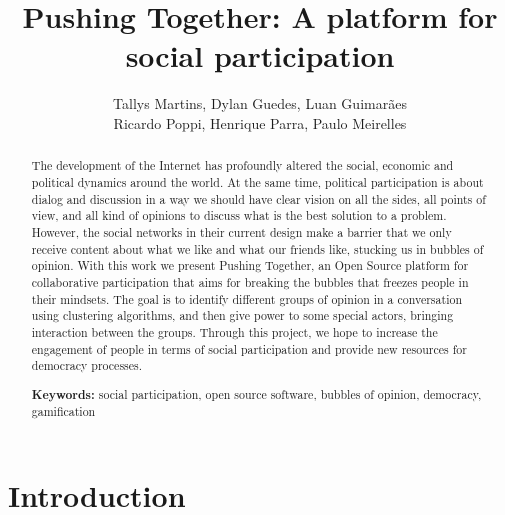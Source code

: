 \documentclass{llncs}
\begin{document}
\sloppy
\title{Pushing Together: A platform for social participation}

\author{Tallys Martins, Dylan Guedes, Luan Guimarães\\
        Ricardo Poppi, Henrique Parra, Paulo Meirelles}



\maketitle
\begin{abstract}

The development of the Internet has profoundly altered the social, economic
and political dynamics around the world. At the same time, political
participation is about dialog and discussion in a way we should have clear
vision on all the sides, all points of view, and all kind of opinions to
discuss what is the best solution to a problem. However, the social networks
in their current design make a barrier that we only receive content about what
we like and what our friends like, stucking us in bubbles of opinion.  With this work we present Pushing
Together, an Open Source platform for collaborative participation that aims for
breaking the bubbles that freezes people in their mindsets. The goal is to
identify different groups of opinion in a conversation using clustering
algorithms, and then give power to some special actors, bringing interaction
between the groups. Through this project, we hope to increase the engagement of
people in terms of social participation and provide new resources for democracy
processes.

\textbf{Keywords:} social participation, open source software, bubbles of
opinion, democracy, gamification
\end{abstract}

\section{Introduction}
\label{sec:intro}
\end{document}
